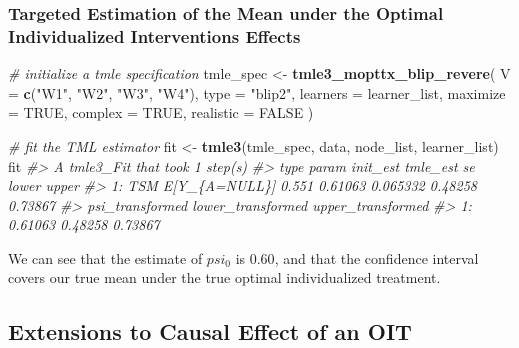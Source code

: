 \documentclass[12pt, krantz2,]{krantz}
\newenvironment{Shaded}{\begin{snugshade}}{\end{snugshade}}
\newcommand{\CommentTok}[1]{\textcolor[rgb]{0.37,0.37,0.37}{\textit{#1}}}
\newcommand{\DataTypeTok}[1]{\textcolor[rgb]{0.27,0.27,0.27}{#1}}
\newcommand{\KeywordTok}[1]{\textcolor[rgb]{0.27,0.27,0.27}{\textbf{#1}}}
\newcommand{\NormalTok}[1]{#1}
\newcommand{\OtherTok}[1]{\textcolor[rgb]{0.37,0.37,0.37}{#1}}
\newcommand{\StringTok}[1]{\textcolor[rgb]{0.5,0.5,0.5}{#1}}
\theoremstyle{definition}
\theoremstyle{definition}
\theoremstyle{definition}
\newcommand{\1}{\mathbbm{1}}
\begin{document}
\hypertarget{targeted-estimation-of-the-mean-under-the-optimal-individualized-interventions-effects-1}{%
\subsubsection{Targeted Estimation of the Mean under the Optimal Individualized Interventions Effects}\label{targeted-estimation-of-the-mean-under-the-optimal-individualized-interventions-effects-1}}

\begin{Shaded}
\begin{Highlighting}[]
\CommentTok{# initialize a tmle specification}
\NormalTok{tmle_spec <-}\StringTok{ }\KeywordTok{tmle3_mopttx_blip_revere}\NormalTok{(}
  \DataTypeTok{V =} \KeywordTok{c}\NormalTok{(}\StringTok{"W1"}\NormalTok{, }\StringTok{"W2"}\NormalTok{, }\StringTok{"W3"}\NormalTok{, }\StringTok{"W4"}\NormalTok{), }\DataTypeTok{type =} \StringTok{"blip2"}\NormalTok{,}
  \DataTypeTok{learners =}\NormalTok{ learner_list, }\DataTypeTok{maximize =} \OtherTok{TRUE}\NormalTok{, }\DataTypeTok{complex =} \OtherTok{TRUE}\NormalTok{,}
  \DataTypeTok{realistic =} \OtherTok{FALSE}
\NormalTok{)}
\end{Highlighting}
\end{Shaded}

\begin{Shaded}
\begin{Highlighting}[]
\CommentTok{# fit the TML estimator}
\NormalTok{fit <-}\StringTok{ }\KeywordTok{tmle3}\NormalTok{(tmle_spec, data, node_list, learner_list)}
\NormalTok{fit}
\CommentTok{#> A tmle3_Fit that took 1 step(s)}
\CommentTok{#>    type         param init_est tmle_est       se   lower   upper}
\CommentTok{#> 1:  TSM E[Y_\{A=NULL\}]    0.551  0.61063 0.065332 0.48258 0.73867}
\CommentTok{#>    psi_transformed lower_transformed upper_transformed}
\CommentTok{#> 1:         0.61063           0.48258           0.73867}
\end{Highlighting}
\end{Shaded}

We can see that the estimate of \(psi_0\) is \(0.60\), and that the confidence
interval covers our true mean under the true optimal individualized treatment.

\hypertarget{extensions-to-causal-effect-of-an-oit}{%
\subsection{Extensions to Causal Effect of an OIT}\label{extensions-to-causal-effect-of-an-oit}}
\end{document}
